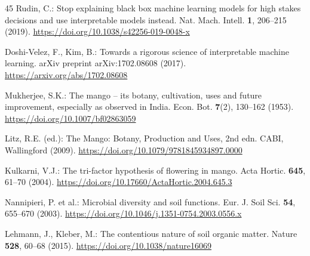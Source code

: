 \documentclass[runningheads,a4paper,oribibl]{llncs}
\begin{document}
\begin{thebibliography}{45}
Rudin, C.: Stop explaining black box machine learning models for high stakes decisions and use interpretable models instead. Nat. Mach. Intell. \textbf{1}, 206--215 (2019). \url{https://doi.org/10.1038/s42256-019-0048-x}

Doshi-Velez, F., Kim, B.: Towards a rigorous science of interpretable machine learning. arXiv preprint arXiv:1702.08608 (2017). \url{https://arxiv.org/abs/1702.08608}

Mukherjee, S.K.: The mango -- its botany, cultivation, uses and future improvement, especially as observed in India. Econ. Bot. \textbf{7}(2), 130--162 (1953). \url{https://doi.org/10.1007/bf02863059}

Litz, R.E. (ed.): The Mango: Botany, Production and Uses, 2nd edn. CABI, Wallingford (2009). \url{https://doi.org/10.1079/9781845934897.0000}

Kulkarni, V.J.: The tri-factor hypothesis of flowering in mango. Acta Hortic. \textbf{645}, 61--70 (2004). \url{https://doi.org/10.17660/ActaHortic.2004.645.3}

Nannipieri, P. et al.: Microbial diversity and soil functions. Eur. J. Soil Sci. \textbf{54}, 655--670 (2003). \url{https://doi.org/10.1046/j.1351-0754.2003.0556.x}

Lehmann, J., Kleber, M.: The contentious nature of soil organic matter. Nature \textbf{528}, 60--68 (2015). \url{https://doi.org/10.1038/nature16069}

\end{thebibliography}
\end{document}
